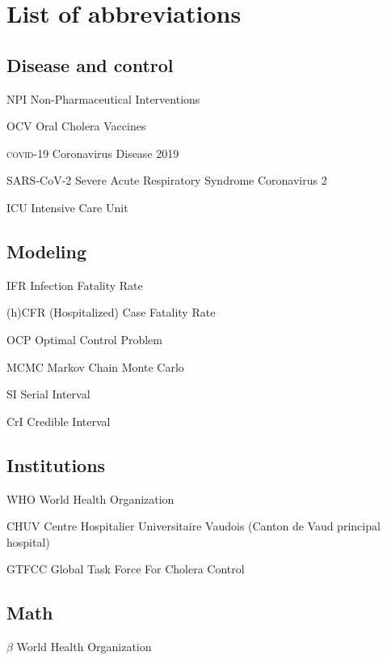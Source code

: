 \chapter*{List of abbreviations}
\begin{fullwidth}
	
\section{Disease and control}
\begin{abbreviations}
    \item[NPI] Non-Pharmaceutical Interventions
    \item[OCV] Oral Cholera Vaccines
    \item[\textsc{covid}-19] Coronavirus Disease 2019
    \item[SARS‑CoV‑2] Severe Acute Respiratory Syndrome Coronavirus 2
     \item[ICU] Intensive Care Unit
\end{abbreviations}
\section{Modeling}
\begin{abbreviations}
        \item[IFR] Infection Fatality Rate
     \item[(h)CFR] (Hospitalized) Case Fatality Rate
     \item[OCP] Optimal Control Problem
     \item[MCMC] Markov Chain Monte Carlo
     \item[SI] Serial Interval
    \item[CrI] Credible Interval

     \end{abbreviations}
\section{Institutions}
\begin{abbreviations}
    \item[WHO] World Health Organization
     \item[CHUV] Centre Hospitalier Universitaire Vaudois (Canton de Vaud principal hospital)
     \item[GTFCC] Global Task Force For Cholera Control
     \end{abbreviations}


\section{Math}
\begin{abbreviations}
    \item[$\beta$] World Health Organization
     \end{abbreviations}
\end{fullwidth}

